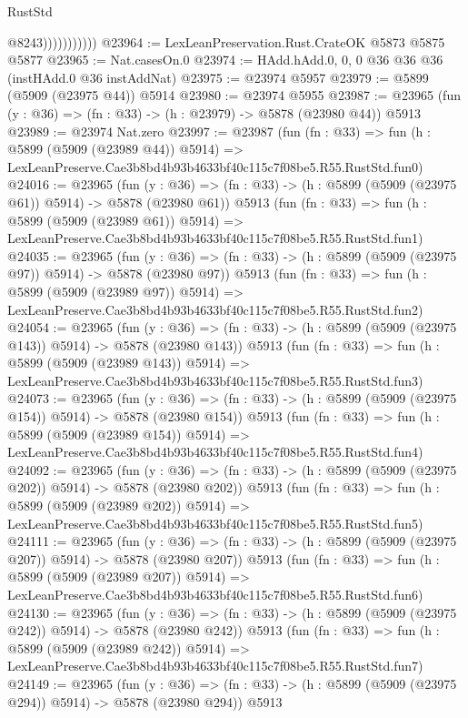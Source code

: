 \begin{lexlean}{RustStd}
\begin{coremodule}
{{                          @8243)))))))))))
@23964 := LexLeanPreservation.Rust.CrateOK @5873 @5875 @5877
@23965 := Nat.casesOn.{0}
@23974 := HAdd.hAdd.{0, 0, 0} @36 @36 @36 (instHAdd.{0} @36 instAddNat)
@23975 := @23974 @5957
@23979 := @5899 (@5909 (@23975 @44)) @5914
@23980 := @23974 @5955
@23987 := @23965 (fun (y : @36) => (fn : @33) -> (h : @23979) -> @5878 (@23980 @44)) @5913
@23989 := @23974 Nat.zero
@23997 := @23987
    (fun (fn : @33) =>
    fun (h : @5899 (@5909 (@23989 @44)) @5914) =>
    LexLeanPreserve.Cae3b8bd4b93b4633bf40c115c7f08be5.R55.RustStd.fun0)
@24016 := @23965
    (fun (y : @36) => (fn : @33) -> (h : @5899 (@5909 (@23975 @61)) @5914) -> @5878 (@23980 @61))
    @5913
    (fun (fn : @33) =>
    fun (h : @5899 (@5909 (@23989 @61)) @5914) =>
    LexLeanPreserve.Cae3b8bd4b93b4633bf40c115c7f08be5.R55.RustStd.fun1)
@24035 := @23965
    (fun (y : @36) => (fn : @33) -> (h : @5899 (@5909 (@23975 @97)) @5914) -> @5878 (@23980 @97))
    @5913
    (fun (fn : @33) =>
    fun (h : @5899 (@5909 (@23989 @97)) @5914) =>
    LexLeanPreserve.Cae3b8bd4b93b4633bf40c115c7f08be5.R55.RustStd.fun2)
@24054 := @23965
    (fun (y : @36) => (fn : @33) -> (h : @5899 (@5909 (@23975 @143)) @5914) -> @5878 (@23980 @143))
    @5913
    (fun (fn : @33) =>
    fun (h : @5899 (@5909 (@23989 @143)) @5914) =>
    LexLeanPreserve.Cae3b8bd4b93b4633bf40c115c7f08be5.R55.RustStd.fun3)
@24073 := @23965
    (fun (y : @36) => (fn : @33) -> (h : @5899 (@5909 (@23975 @154)) @5914) -> @5878 (@23980 @154))
    @5913
    (fun (fn : @33) =>
    fun (h : @5899 (@5909 (@23989 @154)) @5914) =>
    LexLeanPreserve.Cae3b8bd4b93b4633bf40c115c7f08be5.R55.RustStd.fun4)
@24092 := @23965
    (fun (y : @36) => (fn : @33) -> (h : @5899 (@5909 (@23975 @202)) @5914) -> @5878 (@23980 @202))
    @5913
    (fun (fn : @33) =>
    fun (h : @5899 (@5909 (@23989 @202)) @5914) =>
    LexLeanPreserve.Cae3b8bd4b93b4633bf40c115c7f08be5.R55.RustStd.fun5)
@24111 := @23965
    (fun (y : @36) => (fn : @33) -> (h : @5899 (@5909 (@23975 @207)) @5914) -> @5878 (@23980 @207))
    @5913
    (fun (fn : @33) =>
    fun (h : @5899 (@5909 (@23989 @207)) @5914) =>
    LexLeanPreserve.Cae3b8bd4b93b4633bf40c115c7f08be5.R55.RustStd.fun6)
@24130 := @23965
    (fun (y : @36) => (fn : @33) -> (h : @5899 (@5909 (@23975 @242)) @5914) -> @5878 (@23980 @242))
    @5913
    (fun (fn : @33) =>
    fun (h : @5899 (@5909 (@23989 @242)) @5914) =>
    LexLeanPreserve.Cae3b8bd4b93b4633bf40c115c7f08be5.R55.RustStd.fun7)
@24149 := @23965
    (fun (y : @36) => (fn : @33) -> (h : @5899 (@5909 (@23975 @294)) @5914) -> @5878 (@23980 @294))
    @5913
}}
\end{coremodule}
\end{lexlean}
